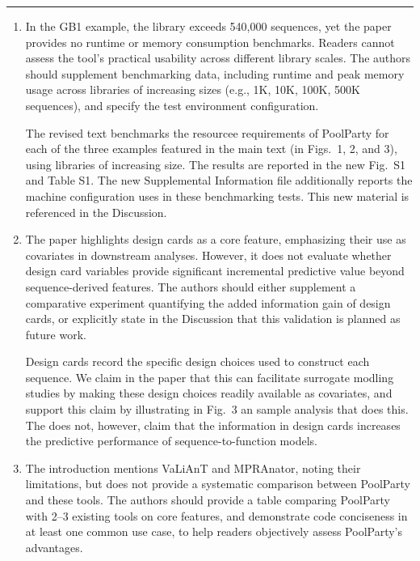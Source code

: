 \documentclass[11pt]{article}
\newenvironment{response}{\par\color{responseblue}}{\par}
\newcommand{\reviewersection}[1]{%
  \bigskip\par\noindent{\large\bfseries #1}\par\medskip\hrule\medskip}
\begin{document}
\reviewersection{Reviewer 1}

\begin{enumerate}
\item In the GB1 example, the library exceeds 540,000 sequences, yet the paper
provides no runtime or memory consumption benchmarks. Readers cannot assess the
tool's practical usability across different library scales. The authors should
supplement benchmarking data, including runtime and peak memory usage across
libraries of increasing sizes (e.g., 1K, 10K, 100K, 500K sequences), and specify
the test environment configuration.

\begin{response}
The revised text benchmarks the resourcee requirements of PoolParty for each of the three examples featured in the main text (in Figs.~1, 2, and 3), using libraries of increasing size. The results are reported in the new Fig.~S1 and Table S1. The new Supplemental Information file additionally reports the machine configuration uses in these benchmarking tests. This new material is referenced in the Discussion. 
\end{response}

\item The paper highlights design cards as a core feature, emphasizing their use
as covariates in downstream analyses. However, it does not evaluate whether
design card variables provide significant incremental predictive value beyond
sequence-derived features. The authors should either supplement a comparative
experiment quantifying the added information gain of design cards, or explicitly
state in the Discussion that this validation is planned as future work.

\begin{response}
Design cards record the specific design choices used to construct each sequence. We claim in the paper that this can facilitate surrogate modling studies by making these design choices readily available as covariates, and support this claim by illustrating in Fig.~3 an sample analysis that does this. The does not, however, claim that the information in design cards increases the predictive performance of sequence-to-function models. 
\end{response}

\item The introduction mentions VaLiAnT and MPRAnator, noting their limitations,
but does not provide a systematic comparison between PoolParty and these tools.
The authors should provide a table comparing PoolParty with 2--3 existing tools
on core features, and demonstrate code conciseness in at least one common use
case, to help readers objectively assess PoolParty's advantages.


\end{enumerate}
\end{document}
